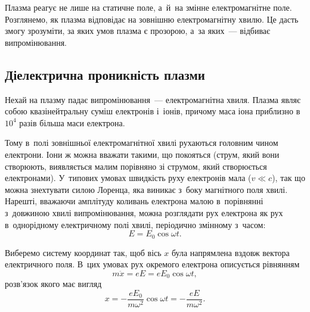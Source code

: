 Плазма реагує не лише на статичне поле, а~й~на змінне електромагнітне поле. Розглянемо, як плазма відповідає на зовнішню електромагнітну хвилю. Це дасть змогу зрозуміти, за яких умов плазма є прозорою, а~за яких~--- відбиває випромінювання.

\subsection{Діелектрична проникність плазми}

Нехай на плазму падає випромінювання~--- електромагнітна хвиля. Плазма являє собою квазінейтральну суміш електронів і~іонів, причому маса іона приблизно в~$10^4$ разів більша маси електрона.

Тому в~полі зовнішньої електромагнітної хвилі рухаються головним чином електрони. Іони ж можна вважати такими, що покояться (струм, який вони створюють, виявляється малим порівняно зі струмом, який створюється електронами). У~типових умовах швидкість руху електронів мала ($v \ll c$), так що можна знехтувати силою Лоренца, яка виникає з~боку магнітного поля хвилі. Нарешті, вважаючи амплітуду коливань електрона малою в~порівнянні з~довжиною хвилі випромінювання, можна розглядати рух електрона як рух в~однорідному електричному полі хвилі, періодично змінному з~часом:
\begin{equation*}
	E = E_0 \cos\omega t.
\end{equation*}

Виберемо систему координат так, щоб вісь $x$ була напрямлена вздовж вектора електричного поля. В~цих умовах рух окремого електрона описується рівнянням
\begin{equation*}
	m\ddot{x} = eE = eE_0\cos\omega t,
\end{equation*}
розв'язок якого має вигляд
\begin{equation*}
	x = -\frac{eE_0}{m\omega^2}\cos\omega t = -\frac{eE}{m\omega^2}.
\end{equation*}

